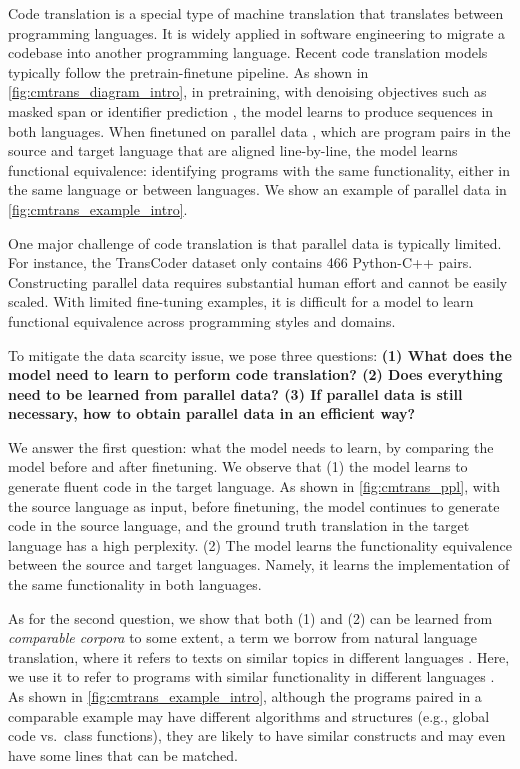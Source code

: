 Code translation is a special type of machine translation that translates between programming languages.
It is widely applied in software engineering to migrate a codebase into another programming language.
Recent code translation models typically follow the pretrain-finetune pipeline.
As shown in \autoref{fig:cmtrans_diagram_intro}, in pretraining, with denoising objectives such as masked span or identifier prediction \cite{plbart,codet5,transcoder}, the model learns to produce sequences in both languages.
When finetuned on parallel data \cite{avatar}, which are program pairs in the source and target language that are aligned line-by-line, the model learns functional equivalence: identifying programs with the same functionality,
either in the same language or between languages.
We show an example of parallel data in \autoref{fig:cmtrans_example_intro}.

One major challenge of code translation is that parallel data is typically limited. For instance, the TransCoder dataset \cite{transcoder} only contains 466 Python-C++ pairs. Constructing parallel data requires substantial human effort and cannot be easily scaled. 
With limited fine-tuning examples, it is difficult for a model to learn functional equivalence across programming styles and domains.

To mitigate the data scarcity issue, we pose three questions: \textbf{
(1) What does the model need to learn to perform code translation? 
(2) Does everything need to be learned from parallel data?
(3) If parallel data is still necessary, how to obtain parallel data in an efficient way?}

We answer the first question: what the model needs to learn, by comparing the model before and after finetuning. We observe that (1) the model learns to generate fluent code in the target language. As shown in \autoref{fig:cmtrans_ppl}, with the source language as input, before finetuning, the model continues to generate code in the source language, and the ground truth translation in the target language has a high perplexity.
(2) The model learns the functionality equivalence between the source and target languages. Namely, it learns the implementation of the same functionality in both languages. 

As for the second question, we show that both (1) and (2) can be learned from \emph{comparable corpora} to some extent, a term we borrow from natural language translation, where it refers to texts on similar topics in different languages \cite{NMTComparableCorpora,low_resource_comp_corpora}.
Here, we use it to refer to programs with similar functionality in different languages \cite{avatar,xcodeeval}.
As shown in \autoref{fig:cmtrans_example_intro}, although the programs paired in a comparable example may have different algorithms and structures (e.g., global code vs.\ class functions), they are likely to have similar constructs and may even have some lines that can be matched.

